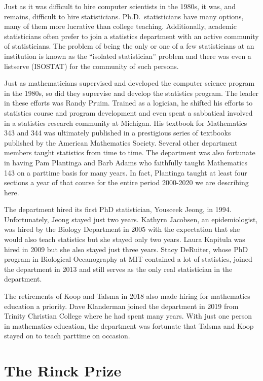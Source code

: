 \documentclass[
]{book}
\begin{document}
Just as it was difficult to hire computer scientists in the 1980s, it was, and remains, difficult to hire statisticians. Ph.D.~statisticians have many options, many of them more lucrative than college teaching. Additionally, academic statisticians often prefer to join a statistics department with an active community of statisticians. The problem of being the only or one of a few statisticians at an institution is known as the ``isolated statistician'' problem and there was even a listserve (ISOSTAT) for the community of such persons.

Just as mathematicians supervised and developed the computer science program in the 1980s, so did they supervise and develop the statistics program. The leader in these efforts was Randy Pruim. Trained as a logician, he shifted his efforts to statistics course and program development and even spent a sabbatical involved in a statistics research community at Michigan. His textbook for Mathematics 343 and 344 was ultimately published in a prestigious series of textbooks published by the American Mathematics Society. Several other department members taught statistics from time to time. The department was also fortunate in having Pam Plantinga and Barb Adams who faithfully taught Mathematics 143 on a parttime basis for many years. In fact, Plantinga taught at least four sections a year of that course for the entire period 2000-2020 we are describing here.

The department hired its first PhD statistician, Yousceek Jeong, in 1994. Unfortunately, Jeong stayed just two years. Kathyrn Jacobsen, an epidemiologist, was hired by the Biology Department in 2005 with the expectation that she would also teach statistics but she stayed only two years. Laura Kapitula was hired in 2009 but she also stayed just three years. Stacy DeRuiter, whose PhD program in Biological Oceanography at MIT contained a lot of statistics, joined the department in 2013 and still serves as the only real statistician in the department.

The retirements of Koop and Talsma in 2018 also made hiring for mathematics education a priority. Dave Klanderman joined the department in 2019 from Trinity Christian College where he had spent many years. With just one person in mathematics education, the department was fortunate that Talsma and Koop stayed on to teach parttime on occasion.

\hypertarget{the-rinck-prize}{%
\chapter{The Rinck Prize}\label{the-rinck-prize}}
\end{document}
